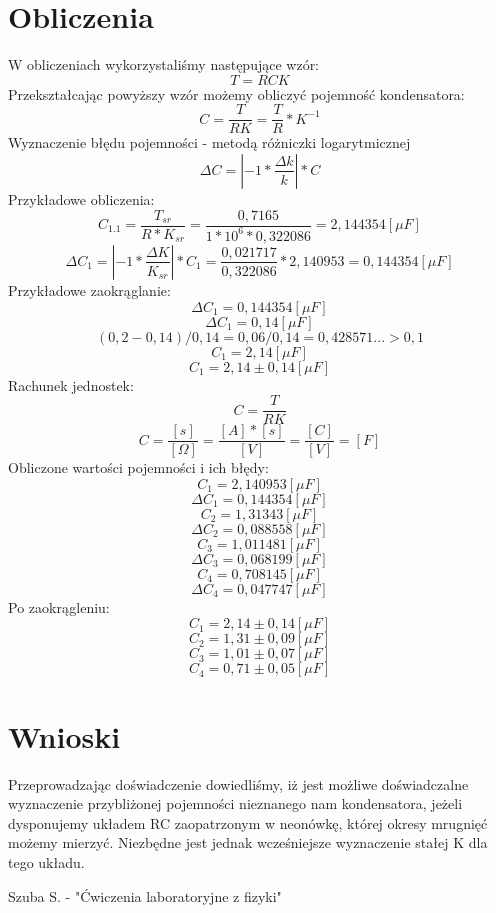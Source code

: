 \documentclass[polish,a4paper]{article}
\begin{document}
\section{Obliczenia}
W obliczeniach wykorzystaliśmy następujące wzór:
$$T=RCK$$
Przekształcając powyższy wzór możemy obliczyć pojemność kondensatora:
$$C=\frac{T}{RK} = \frac{T}{R}*K^{-1}$$
Wyznaczenie błędu pojemności - metodą różniczki logarytmicznej
$$\Delta C = |-1*\frac{\Delta k}{k}|*C$$
Przykładowe obliczenia:
$$C_{1.1} = \frac{T_{sr}}{R*K_{sr}} = \frac{0,7165}{1*10^6*0,322086} = 2,144354 [\mu F]$$
$$\Delta C_1 = |-1*\frac{\Delta K}{K_{sr}}| * C_1 = \frac{0,021717}{0,322086}*2,140953 = 0,144354 [\mu F]$$
Przykładowe zaokrąglanie:
$$\Delta C_1 = 0,144354 [\mu F]$$
$$\Delta C_1 = 0,14 [\mu F]$$
$$(0,2 - 0,14)/0,14 = 0,06/0,14 = 0,428571... > 0,1$$
$$C_1 = 2,14[\mu F]$$
$$C_1 = 2,14 \pm 0,14[\mu F]$$
Rachunek jednostek:
$$C=\frac{T}{RK}$$
$$C=\frac{[s]}{[\Omega]} = \frac{[A]*[s]}{[V]} = \frac{[C]}{[V]} = [F]$$
Obliczone wartości pojemności i ich błędy:
$$C_1 = 2,140953[\mu F]$$
$$\Delta C_1 = 0,144354 [\mu F]$$
$$C_2 = 1,31343[\mu F]$$
$$\Delta C_2 = 0,088558 [\mu F]$$
$$C_3 = 1,011481[\mu F]$$
$$\Delta C_3 = 0,068199 [\mu F]$$
$$C_4 = 0,708145[\mu F]$$
$$\Delta C_4 = 0,047747 [\mu F]$$
Po zaokrągleniu:
$$C_1 = 2,14 \pm 0,14[\mu F]$$
$$C_2 = 1,31 \pm 0,09[\mu F]$$
$$C_3 = 1,01 \pm 0,07[\mu F]$$
$$C_4 = 0,71 \pm 0,05[\mu F]$$
\section{Wnioski}
Przeprowadzając doświadczenie dowiedliśmy, iż jest możliwe doświadczalne wyznaczenie przybliżonej pojemności nieznanego nam kondensatora, jeżeli dysponujemy układem RC zaopatrzonym w neonówkę, której okresy mrugnięć możemy mierzyć. Niezbędne jest jednak wcześniejsze wyznaczenie stałej K dla tego układu.

\begin{thebibliography}{1}
 Szuba S. - "Ćwiczenia laboratoryjne z fizyki"
\end{thebibliography}
\end{document}
